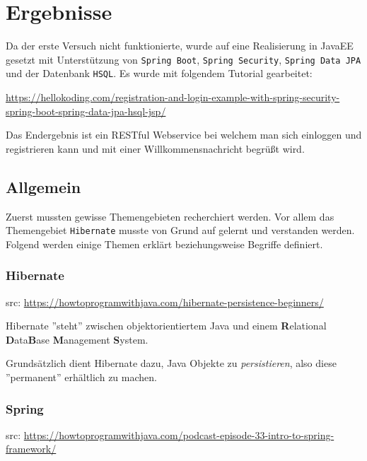 
\section{Ergebnisse}
Da der erste Versuch nicht funktionierte, wurde auf eine Realisierung in JavaEE gesetzt mit Unterstützung von \verb|Spring Boot|, \verb|Spring Security|, \verb|Spring Data JPA| und der Datenbank \verb|HSQL|. Es wurde mit folgendem Tutorial gearbeitet:

\href{https://hellokoding.com/registration-and-login-example-with-spring-security-spring-boot-spring-data-jpa-hsql-jsp/}{https://hellokoding.com/registration-and-login-example-with-spring-security-spring-boot-spring-data-jpa-hsql-jsp/}

Das Endergebnis ist ein RESTful Webservice bei welchem man sich einloggen und registrieren kann und mit einer Willkommensnachricht begrüßt wird. 

\subsection{Allgemein}
Zuerst mussten gewisse Themengebieten recherchiert werden. Vor allem das Themengebiet \verb|Hibernate| musste von Grund auf gelernt und verstanden werden. Folgend werden einige Themen erklärt beziehungsweise Begriffe definiert. 

\subsubsection{Hibernate}

src: \href{https://howtoprogramwithjava.com/hibernate-persistence-beginners/}{https://howtoprogramwithjava.com/hibernate-persistence-beginners/}


Hibernate ''steht'' zwischen objektorientiertem Java und einem \textbf{R}elational \textbf{D}ata\textbf{B}ase \textbf{M}anagement \textbf{S}ystem.

Grundsätzlich dient Hibernate dazu, Java Objekte zu \textit{persistieren}, also diese ''permanent'' erhältlich zu machen.

\subsubsection{Spring} 

src: \href{https://howtoprogramwithjava.com/podcast-episode-33-intro-to-spring-framework/}{https://howtoprogramwithjava.com/podcast-episode-33-intro-to-spring-framework/}


